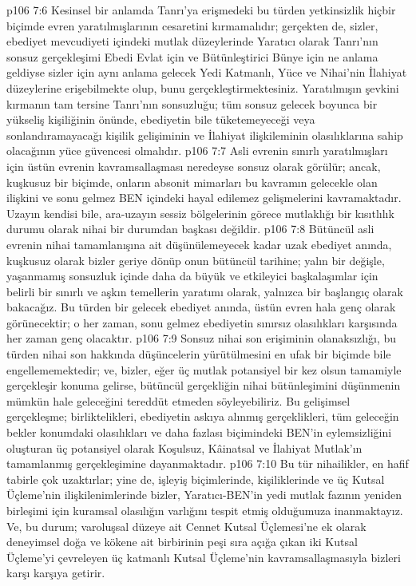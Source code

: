 \vs p106 7:6 Kesinsel bir anlamda Tanrı’ya erişmedeki bu türden yetkinsizlik hiçbir biçimde evren yaratılmışlarının cesaretini kırmamalıdır; gerçekten de, sizler, ebediyet mevcudiyeti içindeki mutlak düzeylerinde Yaratıcı olarak Tanrı’nın sonsuz gerçekleşimi Ebedi Evlat için ve Bütünleştirici Bünye için ne anlama geldiyse sizler için aynı anlama gelecek Yedi Katmanlı, Yüce ve Nihai’nin İlahiyat düzeylerine erişebilmekte olup, bunu gerçekleştirmektesiniz. Yaratılmışın şevkini kırmanın tam tersine Tanrı’nın sonsuzluğu; tüm sonsuz gelecek boyunca bir yükseliş kişiliğinin önünde, ebediyetin bile tüketemeyeceği veya sonlandıramayacağı kişilik gelişiminin ve İlahiyat ilişkileminin olasılıklarına sahip olacağının yüce güvencesi olmalıdır.
\vs p106 7:7 Asli evrenin sınırlı yaratılmışları için üstün evrenin kavramsallaşması neredeyse sonsuz olarak görülür; ancak, kuşkusuz bir biçimde, onların absonit mimarları bu kavramın gelecekle olan ilişkini ve sonu gelmez BEN içindeki hayal edilemez gelişmelerini kavramaktadır. Uzayın kendisi bile, ara\hyp{}uzayın sessiz bölgelerinin görece mutlaklığı  bir kısıtlılık durumu olarak nihai bir durumdan başkası değildir.
\vs p106 7:8 Bütüncül asli evrenin nihai tamamlanışına ait düşünülemeyecek kadar uzak ebediyet anında, kuşkusuz olarak bizler geriye dönüp onun bütüncül tarihine; yalın bir değişle, yaşanmamış sonsuzluk içinde daha da büyük ve etkileyici başkalaşımlar için belirli bir sınırlı ve aşkın temellerin yaratımı olarak, yalnızca bir başlangıç olarak bakacağız. Bu türden bir gelecek ebediyet anında, üstün evren hala genç olarak görünecektir; o her zaman, sonu gelmez ebediyetin sınırsız olasılıkları karşısında her zaman genç olacaktır.
\vs p106 7:9 Sonsuz nihai son erişiminin olanaksızlığı, bu türden nihai son hakkında düşüncelerin yürütülmesini en ufak bir biçimde bile engellememektedir; ve, bizler, eğer üç mutlak potansiyel bir kez olsun tamamiyle gerçekleşir konuma gelirse, bütüncül gerçekliğin nihai bütünleşimini düşünmenin mümkün hale geleceğini tereddüt etmeden söyleyebiliriz. Bu gelişimsel gerçekleşme; birliktelikleri, ebediyetin askıya alınmış gerçeklikleri, tüm geleceğin bekler konumdaki olasılıkları ve daha fazlası biçimindeki BEN’in eylemsizliğini oluşturan üç potansiyel olarak Koşulsuz, Kâinatsal ve İlahiyat Mutlak’ın tamamlanmış gerçekleşimine dayanmaktadır.
\vs p106 7:10 Bu tür nihailikler, en hafif tabirle çok uzaktırlar; yine de, işleyiş biçimlerinde, kişiliklerinde ve üç Kutsal Üçleme’nin ilişkilenimlerinde bizler, Yaratıcı\hyp{}BEN’in yedi mutlak fazının yeniden birleşimi için kuramsal olasılığın varlığını tespit etmiş olduğumuza inanmaktayız. Ve, bu durum; varoluşsal düzeye ait Cennet Kutsal Üçlemesi’ne ek olarak deneyimsel doğa ve kökene ait birbirinin peşi sıra açığa çıkan iki Kutsal Üçleme’yi çevreleyen üç katmanlı Kutsal Üçleme’nin kavramsallaşmasıyla bizleri karşı karşıya getirir.
